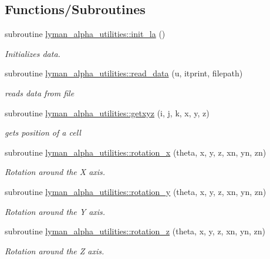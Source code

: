 \subsection*{Functions/\+Subroutines}
\begin{DoxyCompactItemize}
\item 
subroutine \hyperlink{namespacelyman__alpha__utilities_a5f97eeffb7ea030271481514d7072efb}{lyman\+\_\+alpha\+\_\+utilities\+::init\+\_\+la} ()
\begin{DoxyCompactList}\small\item\em Initializes data. \end{DoxyCompactList}\item 
subroutine \hyperlink{namespacelyman__alpha__utilities_a75d86f06c6da27d0754752c23c50b54a}{lyman\+\_\+alpha\+\_\+utilities\+::read\+\_\+data} (u, itprint, filepath)
\begin{DoxyCompactList}\small\item\em reads data from file \end{DoxyCompactList}\item 
subroutine \hyperlink{namespacelyman__alpha__utilities_abdefc59ee98b1526aa3116c0e8f21d98}{lyman\+\_\+alpha\+\_\+utilities\+::getxyz} (i, j, k, x, y, z)
\begin{DoxyCompactList}\small\item\em gets position of a cell \end{DoxyCompactList}\item 
subroutine \hyperlink{namespacelyman__alpha__utilities_afaddcbb27f079d4300ce631609bbb80d}{lyman\+\_\+alpha\+\_\+utilities\+::rotation\+\_\+x} (theta, x, y, z, xn, yn, zn)
\begin{DoxyCompactList}\small\item\em Rotation around the X axis. \end{DoxyCompactList}\item 
subroutine \hyperlink{namespacelyman__alpha__utilities_ae865cec09dd956ff966316caf8ac0c9a}{lyman\+\_\+alpha\+\_\+utilities\+::rotation\+\_\+y} (theta, x, y, z, xn, yn, zn)
\begin{DoxyCompactList}\small\item\em Rotation around the Y axis. \end{DoxyCompactList}\item 
subroutine \hyperlink{namespacelyman__alpha__utilities_a2c97c4405186edcb70d2e37bbe7306da}{lyman\+\_\+alpha\+\_\+utilities\+::rotation\+\_\+z} (theta, x, y, z, xn, yn, zn)
\begin{DoxyCompactList}\small\item\em Rotation around the Z axis. \end{DoxyCompactList}\item 

\end{DoxyCompactItemize}
